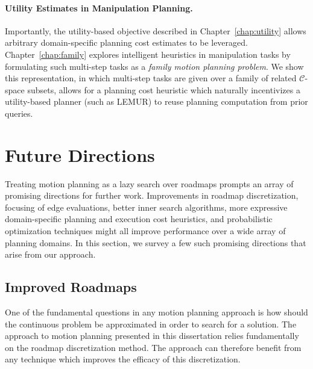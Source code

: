 \paragraph{Utility Estimates in Manipulation Planning.}
Importantly,
the utility-based objective described in Chapter~\ref{chap:utility}
allows arbitrary domain-specific planning cost estimates
to be leveraged.
Chapter~\ref{chap:family} explores intelligent heuristics
in manipulation tasks by formulating such multi-step tasks as
a \emph{family motion planning problem}.
We show this representation,
in which multi-step tasks are given over a family of related
$\mathcal{C}$-space subsets,
allows for a planning cost heuristic
which naturally incentivizes a utility-based planner (such as LEMUR)
to reuse planning computation from prior queries.


\section{Future Directions}
\label{sec:conclusion:future}

Treating motion planning as a lazy search over roadmaps
prompts an array of promising directions for further work.
Improvements in roadmap discretization,
focusing of edge evaluations,
better inner search algorithms,
more expressive domain-specific planning and execution cost
heuristics,
and probabilistic optimization techniques might all improve performance
over a wide array of planning domains.
In this section,
we survey a few such promising directions that arise from our
approach.


\subsection{Improved Roadmaps}
\label{subsec:conclusion:future-roadmaps}

One of the fundamental questions in any motion planning approach
is how should the continuous problem be approximated in order
to search for a solution.
The approach to motion planning presented in this dissertation
relies fundamentally on the roadmap discretization method.
The approach can therefore benefit from any technique which improves
the efficacy of this discretization.

